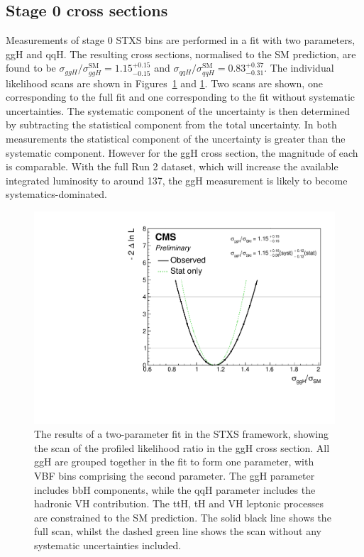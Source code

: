 {\subsection{Stage 0 cross sections}
Measurements of stage 0 STXS bins are performed in a fit with two parameters, ggH and qqH.
The resulting cross sections, normalised to the SM prediction, are found to be 
$\sigma_{ggH}/\sigma_{ggH}^{\textrm{SM}} = 1.15_{-0.15}^{+0.15}$ 
and $\sigma_{qqH}/\sigma_{qqH}^{\textrm{SM}} = 0.83_{-0.31}^{+0.37}$.
The individual likelihood scans are shown 
in Figures~\ref{fig:results_Stage0_ggH} and \ref{fig:results_Stage0_ggH}.
Two scans are shown, one corresponding to the full fit
and one corresponding to the fit without systematic uncertainties.
The systematic component of the uncertainty is then determined 
by subtracting the statistical component from the total uncertainty.
In both measurements the statistical component of the uncertainty 
is greater than the systematic component.
However for the ggH cross section, the magnitude of each is comparable.
With the full Run 2 dataset, 
which will increase the available integrated luminosity to around \SI{137}{\fbinv}, 
the ggH measurement is likely to become systematics-dominated.


\begin{figure}[hptb]
\centering
\includegraphics[width=\textwidth]{Figures/Results/ObsStage0_r_ggH.pdf}
\caption{
  The results of a two-parameter fit in the STXS framework,
  showing the scan of the profiled likelihood ratio in the ggH cross section.
  All ggH are grouped together in the fit to form one parameter, 
  with VBF bins comprising the second parameter.
  The ggH parameter includes bbH components, 
  while the qqH parameter includes the hadronic VH contribution. 
  The ttH, tH and VH leptonic processes are constrained to the SM prediction. 
  The solid black line shows the full scan, 
  whilst the dashed green line shows the scan without any systematic uncertainties included.
}
\label{fig:results_Stage0_ggH}
\end{figure}

}
